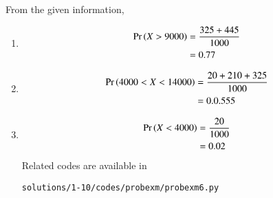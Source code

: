 From the given information,
\begin{enumerate}
\item 
\begin{align}
\Pr\left(X>9000\right) &= \frac{325 +445}{1000}
\\
&=0.77
\end{align}
\item 
\begin{align}
\Pr\left(4000<X<14000\right) &= \frac{20+210+325}{1000}
\\
&=0.0.555
\end{align}
\item 
\begin{align}
\Pr\left(X<4000\right) &= \frac{20}{1000}
\\
&=0.02
\end{align}
Related codes are available in 
\begin{lstlisting}
solutions/1-10/codes/probexm/probexm6.py
\end{lstlisting}
\end{enumerate}
